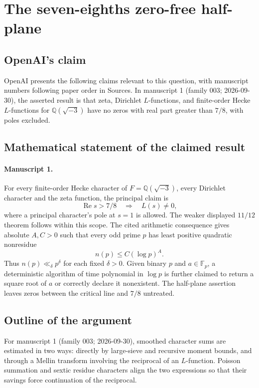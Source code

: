 \documentclass[11pt]{article}
\begin{document}
\section*{The seven-eighths zero-free half-plane}

\subsection{OpenAI's claim}
OpenAI presents the following claims relevant to this question, with manuscript numbers following paper order in Sources. In manuscript 1 (family 003; 2026-09-30), the asserted result is that zeta, Dirichlet $L$-functions, and finite-order Hecke $L$-functions for $\mathbb Q(\sqrt{-3})$ have no zeros with real part greater than $7/8$, with poles excluded.

\subsection{Mathematical statement of the claimed result}
\paragraph{Manuscript 1.}
For every finite-order Hecke character of $F=\mathbb Q(\sqrt{-3})$, every Dirichlet character and the zeta function, the principal claim is
\[
 \operatorname{Re}s>7/8\quad\Longrightarrow\quad L(s)\ne0,
\]
where a principal character's pole at $s=1$ is allowed. The weaker displayed $11/12$ theorem follows within this scope. The cited arithmetic consequence gives absolute $A,C>0$ such that every odd prime $p$ has least positive quadratic nonresidue
\[
 n(p)\le C(\log p)^A.
\]
Thus $n(p)\ll_{\delta} p^{\delta}$ for each fixed $\delta>0$. Given binary $p$ and $a\in\mathbb F_p$, a deterministic algorithm of time polynomial in $\log p$ is further claimed to return a square root of $a$ or correctly declare it nonexistent. The half-plane assertion leaves zeros between the critical line and $7/8$ untreated.

\subsection{Outline of the argument}
For manuscript 1 (family 003; 2026-09-30), smoothed character sums are estimated in two ways: directly by large-sieve and recursive moment bounds, and through a Mellin transform involving the reciprocal of an $L$-function. Poisson summation and sextic residue characters align the two expressions so that their savings force continuation of the reciprocal.
\end{document}
